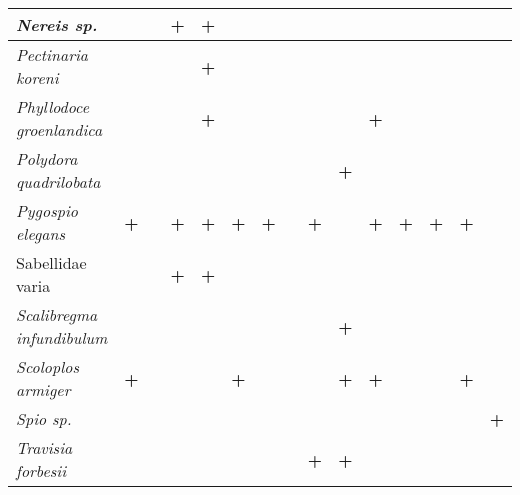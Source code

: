 \begin{footnotesize}
\begin{longtable}{|p{2.1cm}|p{0.38cm}p{0.38cm}|p{0.38cm}p{0.38cm}|p{0.38cm}p{0.38cm}|p{0.35cm}p{0.35cm}p{0.35cm}|p{1cm}|p{0.5cm}p{0.5cm}|p{1cm}|p{1cm}|}
{\it Nereis sp.}                &           &           & \textbf{+}        & \textbf{+}        &           &           &          &          &          &                 &          &          &          &            \\  \hline
{\it Pectinaria koreni}         &           &           &           & \textbf{+}        &           &           &          &          &          &                 &          &          &          &            \\  \hline
{\it Phyllodoce groenlandica}   &           &           &           & \textbf{+}        &           &           &          &          &          & \textbf{+}              &          &          &          &            \\  \hline
{\it Polydora quadrilobata}     &           &           &           &           &           &           &          &          & \textbf{+}       &                 &          &          &          &            \\  \hline
{\it Pygospio elegans}          & \textbf{+}        &           & \textbf{+}        & \textbf{+}        & \textbf{+}        & \textbf{+}        &          & \textbf{+}       &          & \textbf{+}              & \textbf{+}       & \textbf{+}       & \textbf{+}       &            \\  \hline
Sabellidae varia          &           &           & \textbf{+}        & \textbf{+}        &           &           &          &          &          &                 &          &          &          &            \\  \hline
{\it Scalibregma infundibulum}  &           &           &           &           &           &           &          &          & \textbf{+}       &                 &          &          &          &            \\  \hline
{\it Scoloplos armiger}         & \textbf{+}        &           &           &           & \textbf{+}        &           &          &          & \textbf{+}       & \textbf{+}              &          &          & \textbf{+}       &            \\  \hline
{\it Spio sp.}                  &           &           &           &           &           &           &          &          &          &                 &          &          &          & \textbf{+}         \\  \hline
{\it Travisia forbesii}         &           &           &           &           &           &           &          & \textbf{+}       & \textbf{+}       &                 &          &          &          &            \\ \hline

\end{longtable}
\end{footnotesize}
